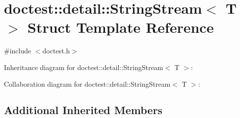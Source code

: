 \hypertarget{structdoctest_1_1detail_1_1_string_stream}{}\section{doctest\+:\+:detail\+:\+:String\+Stream$<$ T $>$ Struct Template Reference}
\label{structdoctest_1_1detail_1_1_string_stream}


{\ttfamily \#include $<$doctest.\+h$>$}



Inheritance diagram for doctest\+:\+:detail\+:\+:String\+Stream$<$ T $>$\+:


Collaboration diagram for doctest\+:\+:detail\+:\+:String\+Stream$<$ T $>$\+:
\subsection*{Additional Inherited Members}
